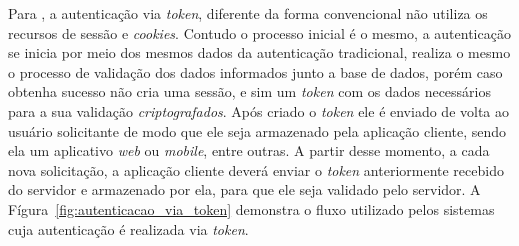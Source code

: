 Para , a autenticação via \textit{token}, diferente da forma convencional não utiliza os recursos de sessão e \textit{cookies}. Contudo o processo inicial é o mesmo, a autenticação se inicia por meio dos mesmos dados da autenticação tradicional, realiza o mesmo o processo de validação dos dados informados junto a base de dados, porém caso obtenha sucesso não cria uma sessão, e sim um \textit{token} com os dados necessários para a sua validação \textit{criptografados}. Após criado o \textit{token} ele é enviado de volta ao usuário solicitante de modo que ele seja armazenado pela aplicação cliente, sendo ela um aplicativo \textit{web} ou \textit{mobile}, entre outras. A partir desse momento, a cada nova solicitação, a aplicação cliente deverá enviar o \textit{token} anteriormente recebido do servidor e armazenado por ela, para que ele seja validado pelo servidor. A Fígura~\ref{fig:autenticacao_via_token} demonstra o fluxo utilizado pelos sistemas cuja autenticação é realizada via \textit{token}.

